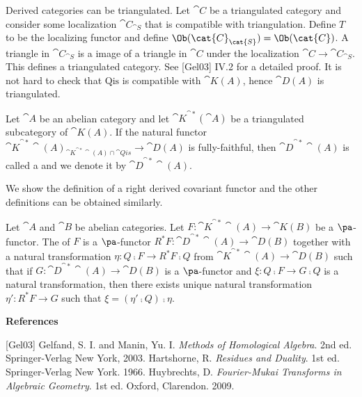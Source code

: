 \par
Derived categories can be triangulated. Let $\cat{C}$ be a triangulated category and consider some localization ${\cat{C}}_{\cat{S}}$ that is compatible with triangulation. Define $T$ to be the localizing functor and define $\Ob({\cat{C}}_{\cat{S}})=\Ob(\cat{C})$. A triangle in ${\cat{C}}_{\cat{S}}$ is a image of a triangle in $\cat{C}$ under the localization $\cat{C}\to{\cat{C}}_{\cat{S}}$. This defines a triangulated category. See [Gel03] IV.2 for a detailed proof. It is not hard to check that $\text{Qis}$ is compatible with $\cat{K(A)}$, hence $\cat{D(A)}$ is triangulated.
\begin{definition}
    Let $\cat{A}$ be an abelian category and let ${\cat{K}}^{\cat{*}}(\cat{A})$ be a triangulated subcategory of $\cat{K(A)}$. If the natural functor ${{\cat{K}}^{\cat{*}}\cat{(A)}}_{{\cat{K}}^{\cat{*}}\cat{(A)}\cap\cat{Qis}}\to\cat{D(A)}$ is fully-faithful, then ${\cat{D}}^{\cat{*}}\cat{(A)}$ is called a  and we denote it by ${\cat{D}}^{\cat{*}}\cat{(A)}$. 
\end{definition}
\par
We show the definition of a right derived covariant functor and the other definitions can be obtained similarly.
\begin{definition}
    Let $\cat{A}$ and $\cat{B}$ be abelian categories. Let $F:{\cat{K}}^{\cat{*}}\cat{(A)}\to\cat{K(B)}$ be a $\pa$-functor. The  of $F$ is a $\pa$-functor ${R}^{*}F:{\cat{D}}^{\cat{*}}\cat{(A)}\to\cat{D(B)}$ together with a natural transformation $\eta:Q\comp F\to{R}^{*}F\comp Q$ from ${\cat{K}}^{\cat{*}}\cat{(A)}\to\cat{D(B)}$ such that if $G:{\cat{D}}^{\cat{*}}\cat{(A)}\to\cat{D(B)}$ is a $\pa$-functor and $\xi:Q\comp F\to G\comp Q$ is a natural transformation, then there exists unique natural transformation $\eta':{R}^{*}F\to G$ such that $\xi=(\eta'\comp Q)\comp\eta$.
\end{definition}
\vspace{\baselineskip}
\begin{center}
    \large\bfseries References\normalsize
\end{center}
[Gel03] Gelfand, S. I. and Manin, Yu. I. \textit{Methods of Homological Algebra}. 2nd ed. Springer-Verlag New York, 2003.
\newline
[Har66] Hartshorne, R. \textit{Residues and Duality}. 1st ed. Springer-Verlag New York. 1966.
\newline
[Huy09] Huybrechts, D. \textit{Fourier-Mukai Transforms in Algebraic Geometry}. 1st ed. Oxford, Clarendon. 2009.